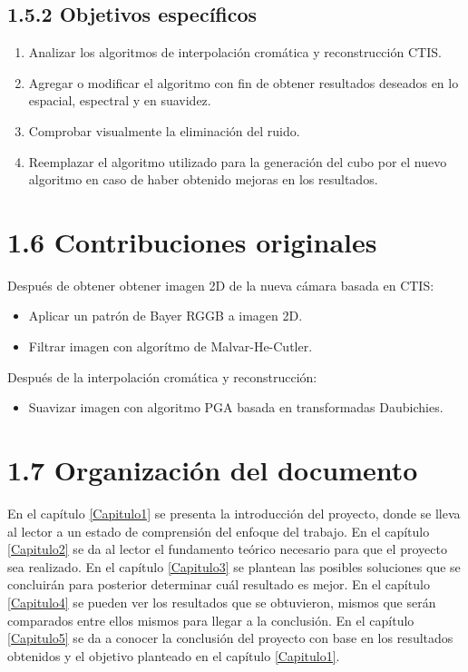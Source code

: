 \subsection{1.5.2 Objetivos específicos}
\begin{enumerate}
\item Analizar los algoritmos de interpolación cromática y reconstrucción CTIS.
\item Agregar o modificar el algoritmo con fin de obtener resultados deseados en lo espacial, espectral y en suavidez.
\item Comprobar visualmente la eliminación del ruido.
\item Reemplazar el algoritmo utilizado para la generación del cubo por el nuevo algoritmo en caso de haber obtenido mejoras en los resultados. 
\end{enumerate}

\section{1.6 Contribuciones originales}
Después de obtener obtener imagen 2D de la nueva cámara\cite{JairoCamera} basada en CTIS\cite{PracCam}:
\begin{itemize}
\item Aplicar un patrón de Bayer RGGB a imagen 2D.
\item Filtrar imagen con algorítmo de Malvar-He-Cutler.
\end{itemize}
Después de la interpolación cromática y reconstrucción: 
\begin{itemize}
\item Suavizar imagen con algoritmo PGA basada en transformadas Daubichies.
\end{itemize}

\section{1.7 Organización del documento}
En el capítulo \ref{Capitulo1} se presenta la introducción del proyecto, donde se lleva al lector a un estado de comprensión del enfoque del trabajo.
En el capítulo \ref{Capitulo2} se da al lector el fundamento teórico necesario para que el proyecto sea realizado.
En el capítulo \ref{Capitulo3} se plantean las posibles soluciones que se concluirán para posterior determinar cuál resultado es mejor.
En el capítulo \ref{Capitulo4} se pueden ver los resultados que se obtuvieron, mismos que serán comparados entre ellos mismos para llegar a la conclusión.
En el capítulo \ref{Capitulo5} se da a conocer la conclusión del proyecto con base en los resultados obtenidos y el objetivo planteado en el capítulo \ref{Capitulo1}.
